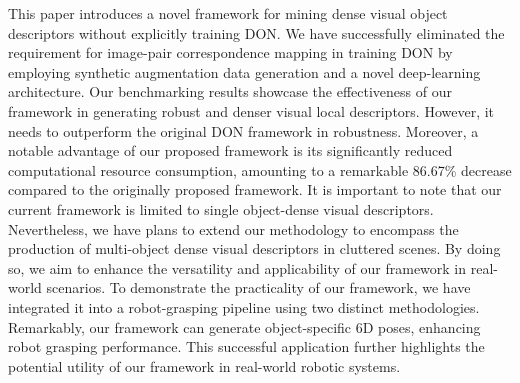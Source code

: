 This paper introduces a novel framework for mining dense visual object descriptors without explicitly training DON. We have successfully
eliminated the requirement for image-pair correspondence mapping in training DON by employing synthetic augmentation data generation and a novel deep-learning architecture.
Our benchmarking results showcase the effectiveness of our framework in generating robust and denser visual local descriptors.
However, it needs to outperform the original DON framework in robustness.
Moreover, a notable advantage of our proposed framework is its significantly reduced computational resource consumption,
amounting to a remarkable 86.67\% decrease compared to the originally proposed framework.
It is important to note that our current framework is limited to single object-dense visual descriptors. Nevertheless,
we have plans to extend our methodology to encompass the production of multi-object dense visual descriptors in cluttered scenes.
By doing so, we aim to enhance the versatility and applicability of our framework in real-world scenarios.
To demonstrate the practicality of our framework, we have integrated it into a robot-grasping pipeline using two distinct methodologies.
Remarkably, our framework can generate object-specific 6D poses, enhancing robot grasping performance.
This successful application further highlights the potential utility of our framework in real-world robotic systems.